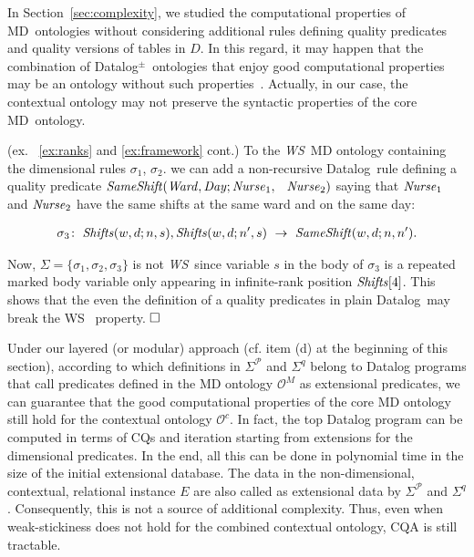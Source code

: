\documentclass[format=acmsmall, review=false, screen=true]{acmart}
\newcommand{\boxtheorem}{\ensuremath{\hfill \Box}}
\newcommand{\mc}[1]{\mathcal{ #1}}
\newcommand{\da}{Datalog}
\newcommand{\dpm}{{Datalog}$^\pm$}
\newcommand{\m}{\;\!\!}
\newcommand{\WS}{{\em W\m{}S}}
\newcommand{\md}{MD}
\newcommand{\red}[1]{{#1}}
\begin{document}
In Section~\ref{sec:complexity}, we studied the computational properties of \md \ ontologies without considering additional rules defining quality predicates and quality versions of  tables in $D$. In this regard,
 it may happen that the combination of \dpm \ ontologies that enjoy good computational properties may be an ontology without such properties~\cite{baget11ai,baget15}. Actually, in our case,
 the contextual ontology may not preserve the syntactic properties of the core \md \ ontology.



\begin{example} \label{ex:nws} (ex.~ \ref{ex:ranks} and \ref{ex:framework} cont.) To the \WS \ MD ontology containing the dimensional rules $\sigma_1$, $\sigma_2$. we can add a non-recursive \da \ rule defining  a quality predicate ${\it SameShift}({\it Ward},{\it Day};{\it Nurse}_1,$ \ ${\it Nurse}_2)$ saying that ${\it Nurse}_1$ and ${\it Nurse}_2$ have the same shifts at the same ward and on the same day:

\vspace{-4mm}
\begin{align*}
\sigma_3\!: \ {\it Shifts}(w,d;n,s), {\it Shifts}(w,d;n',s) \ \rightarrow \ {\it SameShift}(w,d;n,n').
\end{align*}
\vspace{-4mm}

\noindent Now, $\Sigma=\{\sigma_1,\sigma_2,\sigma_3\}$ is not \WS \ since variable $s$ in the body of $\sigma_3$ is a repeated marked body variable only appearing in infinite-rank position ${\it Shifts}[4]$. This shows that the even the definition of a quality predicates in plain \da \ may break the WS \ property. \boxtheorem \end{example}





 Under our layered (or modular) approach \red{(cf. item (d) at the beginning of this section)}, according to which  definitions in $\Sigma^\mc{P}$ and $\Sigma^q$ belong to Datalog programs that call predicates defined in the MD ontology $\mc{O}^M$ as  extensional predicates, we can guarantee that the good computational properties
 of the core MD ontology still hold for the contextual ontology $\mc{O}^c$. \red{In fact, the top Datalog program can be computed in terms of CQs and iteration starting from extensions for the dimensional predicates. In the end, all this can be done in polynomial time in the size of the initial extensional database.} The data in the non-dimensional, contextual, relational instance $E$ are also called as extensional data by  $\Sigma^\mc{P}$ and $\Sigma^q$. Consequently, this is not a source of additional complexity. Thus, even when weak-stickiness does not hold for the combined contextual ontology, CQA is still tractable.
\end{document}
